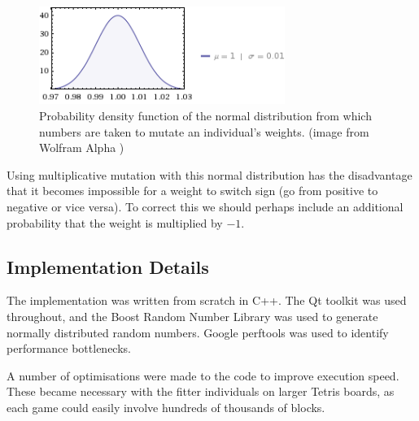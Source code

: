 \documentclass[a4paper,12pt]{article}
\begin{document}
\begin{figure}[hb]
  \centering
  \includegraphics[width=8cm]{normaldist.png}
  \caption{Probability density function of the normal distribution from which
      numbers are taken to mutate an individual's weights. (image from Wolfram
      Alpha \cite{Wolfram})}
  \label{NormalDist}
\end{figure}

Using multiplicative mutation with this normal distribution has the disadvantage
that it becomes impossible for a weight to switch sign (go from positive to
negative or vice versa).
To correct this we should perhaps include an additional probability that the
weight is multiplied by $-1$.

\subsection{Implementation Details}

The implementation was written from scratch in C++.
The Qt toolkit \cite{Qt} was used throughout, and the Boost Random Number
Library \cite{BoostRandom} was used to generate normally distributed random
numbers.
Google perftools \cite{GooglePerftools} was used to identify performance
bottlenecks.

A number of optimisations were made to the code to improve execution speed.
These became necessary with the fitter individuals on larger Tetris boards, as
each game could easily involve hundreds of thousands of blocks.
\end{document}
